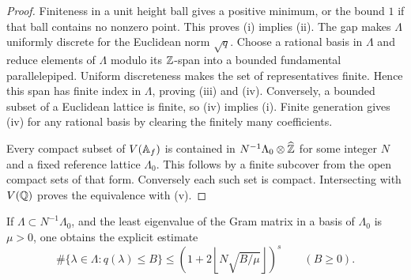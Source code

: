 
\begin{proof}
Finiteness in a unit height ball gives a positive minimum, or the
bound \(1\) if that ball contains no nonzero point. This proves
(i) implies (ii). The gap makes \(\Lambda\) uniformly discrete
for the Euclidean norm \(\sqrt q\). Choose a rational basis in
\(\Lambda\) and reduce elements of \(\Lambda\) modulo its
\(\mathbb Z\)-span into a bounded fundamental parallelepiped. Uniform
discreteness makes the set of representatives finite. Hence this
span has finite index in \(\Lambda\), proving (iii) and (iv).
Conversely, a bounded subset of a Euclidean lattice is finite,
so (iv) implies (i). Finite generation gives (iv) for any rational
basis by clearing the finitely many coefficients.

Every compact subset of \(V(\mathbb A_f)\) is contained in
\(N^{-1}\Lambda_0\otimes\widehat{\mathbb Z}\) for some integer \(N\)
and a fixed reference lattice \(\Lambda_0\). This follows by a
finite subcover from the open compact sets of that form. Conversely
each such set is compact. Intersecting with \(V(\mathbb Q)\) proves the
equivalence with (v).
\end{proof}

If \(\Lambda\subset N^{-1}\Lambda_0\), and the least eigenvalue
of the Gram matrix in a basis of \(\Lambda_0\) is \(\mu>0\),
one obtains the explicit estimate
\begin{equation}\label{eq:lattice-count}
 \#\{\lambda\in\Lambda:q(\lambda)\le B\}
 \le\left(1+2\left\lfloor N\sqrt{B/\mu}\right\rfloor\right)^s
 \qquad(B\ge0).
\end{equation}

